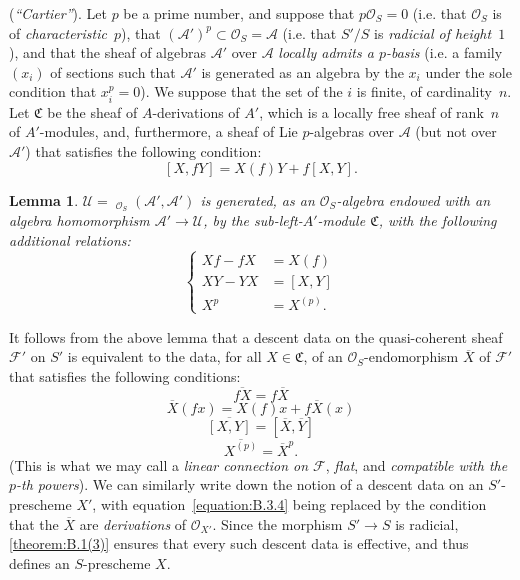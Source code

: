 \documentclass{article}
\theoremstyle{plain}
\newtheorem*{lemma*}{Lemma}
\theoremstyle{definition}
\newenvironment{example}[1]
  {\renewcommand\theinnercustomexample{#1}\innercustomexample}
  {\endinnercustomexample}
\newcommand{\sh}[1]{{\mathscr{#1}}}
\newcommand{\fk}[1]{{\mathfrak{#1}}}
\DeclareMathOperator{\Hom}{Hom}
\DeclareMathOperator{\shHom}{\underline{\Hom}}
\newcommand{\oldpage}[1]{\marginpar{\footnotesize$\Big\vert$ \textit{p.~#1}}}
\begin{document}
\begin{example}{2}
\label{example:B.3(2)}
  (\emph{``Cartier''}).
  Let $p$ be a prime number, and suppose that $p\sh{O}_S=0$ (i.e. that $\sh{O}_S$ is of \emph{characteristic~$p$}), that $(\sh{A}')^p\subset\sh{O}_S=\sh{A}$ (i.e. that $S'/S$ is \emph{radicial of height~$1$}), and that the sheaf of algebras $\sh{A}'$ over $\sh{A}$ \emph{locally admits a $p$-basis} (i.e. a family $(x_i)$ of sections such that $\sh{A}'$ is generated as an algebra by the $x_i$ under the sole condition that $x_i^p=0$).
  We suppose that the set of the $i$ is finite, of cardinality~$n$.
  Let $\fk{C}$ be the sheaf of $A$-derivations of $A'$, which is a locally free sheaf of rank~$n$ of $A'$-modules, and, furthermore, a sheaf of Lie $p$-algebras over $\sh{A}$ (but not over $\sh{A}'$) that satisfies the following condition:
  \[
  \label{equation:B.3.5}
    [X,fY] = X(f)Y + f[X,Y].
  \tag{3.5}
  \]
\end{example}

\begin{lemma*}
  $\sh{U}=\shHom_{\sh{O}_S}(\sh{A}',\sh{A}')$ is generated, as an $\sh{O}_S$-algebra endowed with an algebra homomorphism $\sh{A}'\to\sh{U}$, by the sub-left-$A'$-module $\fk{C}$, with the following additional relations:
  \[
  \label{equation:B.3.6}
    \begin{cases}
      Xf-fX &= X(f)
    \\XY-YX &= [X,Y]
    \\X^p &= X^{(p)}.
    \end{cases}
  \tag{3.6}
  \]
\end{lemma*}

It follows from the above lemma that a descent data on the quasi-coherent sheaf $\sh{F}'$ on $S'$ is equivalent to the data, for all $X\in\fk{C}$, of an $\sh{O}_S$-endomorphism $\overline{X}$ of $\sh{F}'$ that satisfies the following conditions:
\[
\label{equation:B.3.7}
  \overline{fX} = f\overline{X}
\tag{3.7}
\]
\[
\label{equation:B.3.8}
  \overline{X}(fx) = X(f)x + f\overline{X}(x)
\tag{3.8}
\]
\[
\label{equation:B.3.9}
  \overline{[X,Y]} = [\overline{X},\overline{Y}]
\tag{3.9}
\]
\[
\label{equation:B.3.10}
  \overline{X^{(p)}} = \overline{X}^p.
\tag{3.10}
\]
(This is what we may call a \emph{linear connection on $\sh{F}$}, \emph{flat}, and \emph{compatible with the $p$-th powers}).
We can similarly write down the notion of a descent data on an $S'$-prescheme $X'$, with equation~\cref{equation:B.3.4} being replaced by the condition that the $\overline{X}$ are \emph{derivations} of $\sh{O}_{X'}$.
Since the morphism $S'\to S$ is radicial, \cref{theorem:B.1(3)} ensures that every such descent data is
\oldpage{190-24}
effective, and thus defines an $S$-prescheme $X$.
\end{document}
